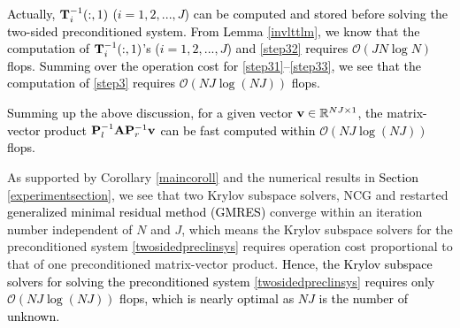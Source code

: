 \documentclass[11pt]{article}%
\numberwithin{equation}{section}
\newtheorem{remark}{Remark}
\newcommand{\blockdiag}{\mathrm{blkdiag}}
\begin{document}
\textcolor{black}{Actually, ${\bf T}_i^{-1}(:,1)$ ($i=1,2,...,J$) can be computed and stored before solving the two-sided preconditioned system. From Lemma \ref{invlttlm}, we know that the computation of ${\bf T}_i^{-1}(:,1)$'s ($i=1,2,...,J$) and \eqref{step32} requires $\mathcal{O}(JN\log N)$ flops. Summing over the operation cost for \eqref{step31}--\eqref{step33}, we see that the computation of \eqref{step3} requires $\mathcal{O}(NJ\log (NJ))$ flops.}

\textcolor{black}{Summing up the above discussion, for a given vector  ${\bf v}\in\mathbb{R}^{NJ\times 1}$, the matrix-vector product ${\bf P}_l^{-1}{\bf A}{\bf P}_r^{-1}{\bf v}$ can be fast computed within  $\mathcal{O}(NJ\log(NJ))$ flops.}



As supported by Corollary \ref{maincoroll} and the numerical results in \textcolor{black}{Section \ref{experimentsection}}, we see that two Krylov subspace solvers, NCG and restarted \textcolor{black}{generalized minimal residual method (GMRES)} converge within an iteration number independent of $N$ and $J$, which means the Krylov subspace solvers for the preconditioned system \eqref{twosidedpreclinsys} requires operation cost proportional to that of one preconditioned matrix-vector product. \textcolor{black}{Hence, the Krylov subspace solvers for solving the preconditioned system \eqref{twosidedpreclinsys} requires only $\mathcal{O}(NJ\log(NJ))$ flops, which is nearly optimal as $NJ$ is the number of unknown.}
%
\end{document}
